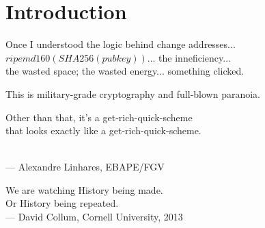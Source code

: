




\chapter{Introduction}



\bigskip

\begin{flushright}{\slshape
    {Once I understood the logic behind change addresses...\\
    $ripemd160( SHA256( pubkey ) )$... the inneficiency... \\
    the wasted space; the wasted energy... something clicked.\\
    \medskip

    This is military-grade cryptography and full-blown paranoia.\\
    \medskip

    Other than that, it's a get-rich-quick-scheme \\
    that looks exactly like a get-rich-quick-scheme.}
	\\ \medskip
    --- Alexandre Linhares, EBAPE/FGV

        \bigskip
        \bigskip
        \bigskip
        \bigskip

    {We are watching History being made.\\
    Or History being repeated.}
	\\ \medskip
    --- David Collum, Cornell University, 2013}
\end{flushright}
\bigskip
\bigskip
\bigskip
\bigskip

